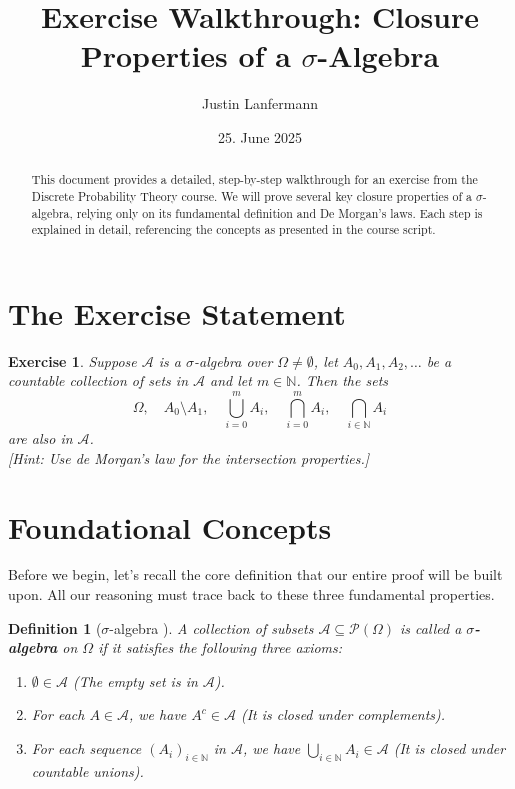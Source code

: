 \documentclass[11pt,a4paper]{article}
\title{Exercise Walkthrough: Closure Properties of a $\sigma$-Algebra}
\author{Justin Lanfermann}
\date{25. June 2025}
\newtheorem{definition}{Definition}
\newtheorem{exercise}{Exercise}
\theoremstyle{definition}
\begin{document}
\maketitle

\begin{abstract}
    This document provides a detailed, step-by-step walkthrough for an exercise from the Discrete Probability Theory course. We will prove several key closure properties of a $\sigma$-algebra, relying only on its fundamental definition and De Morgan's laws. Each step is explained in detail, referencing the concepts as presented in the course script.
\end{abstract}

\section{The Exercise Statement}

\begin{exercise}
Suppose $\mathcal{A}$ is a $\sigma$-algebra over $\Omega \neq \emptyset$, let $A_0, A_1, A_2, \dots$ be a countable collection of sets in $\mathcal{A}$ and let $m \in \mathbb{N}$. Then the sets
\[
    \Omega, \quad A_0 \setminus A_1, \quad \bigcup_{i=0}^{m} A_i, \quad \bigcap_{i=0}^{m} A_i, \quad \bigcap_{i \in \mathbb{N}} A_i
\]
are also in $\mathcal{A}$. \\
\textit{[Hint: Use de Morgan’s law for the intersection properties.]}
\end{exercise}

\section{Foundational Concepts}

Before we begin, let's recall the core definition that our entire proof will be built upon. All our reasoning must trace back to these three fundamental properties.

\begin{definition}[$\sigma$-algebra \textnormal{\cite[Def. 1.5]{script}}]
\label{def:sigma_algebra}
A collection of subsets $\mathcal{A} \subseteq \mathcal{P}(\Omega)$ is called a \textbf{$\sigma$-algebra} on $\Omega$ if it satisfies the following three axioms:
\begin{enumerate}
    \item[(i)] $\emptyset \in \mathcal{A}$ (The empty set is in $\mathcal{A}$).
    \item[(ii)] For each $A \in \mathcal{A}$, we have $A^c \in \mathcal{A}$ (It is closed under complements).
    \item[(iii)] For each sequence $(A_i)_{i \in \mathbb{N}}$ in $\mathcal{A}$, we have $\bigcup_{i \in \mathbb{N}} A_i \in \mathcal{A}$ (It is closed under countable unions).
\end{enumerate}
\end{definition}
\end{document}
